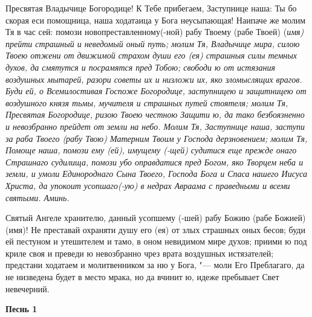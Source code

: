 \mychapterending

 


Пресвятая Владычице Богородице! К Тебе прибегаем, Заступнице наша: Ты бо скорая еси помощница, наша ходатаица у Бога неусыпающая! Наипаче же молим Тя в час сей: помози новопреставленному(-ной) рабу Твоему (рабе Твоей) (\itshape имя\normalfont{}) прейти страшный и неведомый оный путь; молим Тя, Владычице мира, силою Твоею отжени от движимой страхом души его (ея) страшныя силы темных духов, да смятутся и посрамятся пред Тобою; свободи ю от истязания воздушных мытарей, разори советы их и низложи их, яко зломыслящих врагов. Буди ей, о Всемилостивая Госпоже Богородице, заступницею и защитницею от воздушного князя тьмы, мучителя и страшных путей стоятеля; молим Тя, Пресвятая Богородице, ризою Твоею честною Защити ю, да тако безбоязненно и невозбранно прейдет от земли на небо. Молим Тя, Заступнице наша, заступи за раба Твоего (рабу Твою) Матерним Твоим у Господа дерзновением; молим Тя, Помоще наша, помози ему (ей), имущему (-щей) судитися еще прежде онаго Страшнаго судилища, помози убо оправдатися пред Богом, яко Творцем неба и земли, и умоли Единороднаго Сына Твоего, Господа Бога и Спаса нашего Иисуса Христа, да упокоит усопшаго(-ую) в недрах Авраама с праведными и всеми святыми. Аминь.


\mychapterending

 


Святый Ангеле хранителю, данный усопшему (-шей) рабу Божию (рабе Божией) (имя)! Не преставай охраняти душу его (ея) от злых страшных оных бесов; буди ей пестуном и утешителем и тамо, в оном невидимом мире духов; приими ю под криле своя и преведи ю невозбранно чрез врата воздушных истязателей; предстани ходатаем и молитвенником за ню у Бога, "--- моли Его Преблагаго, да не низведена будет в место мрака, но да вчинит ю, идеже пребывает Свет невечерний. 


\mychapterending

 
 





\bfseries Песнь 1\normalfont{}



